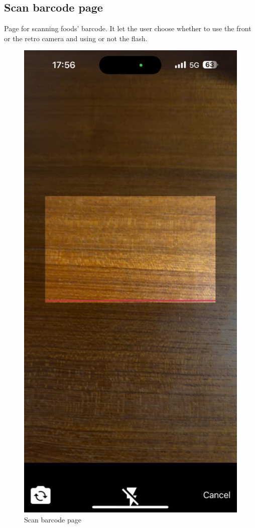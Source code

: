 \documentclass{Configuration_Files/PoliMi3i_thesis}
\begin{document}
\subsection{Scan barcode page}

\begin{minipage}{\linewidth}
    Page for scanning foods' barcode. It let the user choose whether to use the front or the retro camera and using or not the flash.
\end{minipage}

\begin{figure}[!h]
  \centering
  \includegraphics[scale=0.3]{Images/Screenshots/Mobile/Barcode.jpeg}
  \caption{Scan barcode page}
\end{figure}
\end{document}
